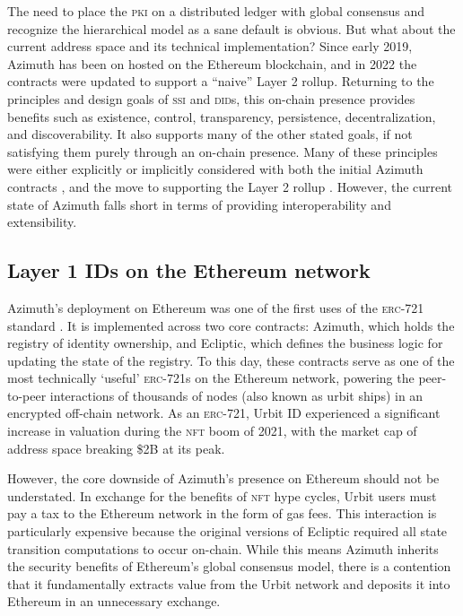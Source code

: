 \documentclass[twoside]{article}
\begin{document}
The need to place the \textsc{pki} on a distributed ledger with global consensus and recognize the hierarchical model as a sane default is obvious. But what about the current address space and its technical implementation? Since early 2019, Azimuth has been on hosted on the Ethereum blockchain, and in 2022 the contracts were updated to support a ``naive'' Layer 2 rollup. Returning to the principles and design goals of \textsc{ssi} and \textsc{did}s, this on-chain presence provides benefits such as existence, control, transparency, persistence, decentralization, and discoverability. It also supports many of the other stated goals, if not satisfying them purely through an on-chain presence. Many of these principles were either explicitly or implicitly considered with both the initial Azimuth contracts \citep{WolfePaul2019}, and the move to supporting the Layer 2 rollup \citep{Paprocki2021}. However, the current state of Azimuth falls short in terms of providing interoperability and extensibility. 

\subsection{Layer 1 IDs on the Ethereum network}

Azimuth's deployment on Ethereum was one of the first uses of the \textsc{erc}-721 standard \citep{ERC721}. It is implemented across two core contracts: Azimuth, which holds the registry of identity ownership, and Ecliptic, which defines the business logic for updating the state of the registry. To this day, these contracts serve as one of the most technically `useful' \textsc{erc}-721s on the Ethereum network, powering the peer-to-peer interactions of thousands of nodes (also known as urbit ships) in an encrypted off-chain network. As an \textsc{erc}-721, Urbit ID experienced a significant increase in valuation during the \textsc{nft} boom of 2021, with the market cap of address space breaking \$2B at its peak.

However, the core downside of Azimuth's presence on Ethereum should not be understated. In exchange for the benefits of \textsc{nft} hype cycles, Urbit users must pay a tax to the Ethereum network in the form of gas fees. This interaction is particularly expensive because the original versions of Ecliptic required all state transition computations to occur on-chain. While this means Azimuth inherits the security benefits of Ethereum's global consensus model, there is a contention that it fundamentally extracts value from the Urbit network and deposits it into Ethereum in an unnecessary exchange.
\end{document}
